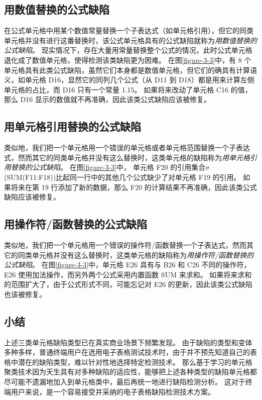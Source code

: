 \subsection{用数值替换的公式缺陷}
在公式单元格中用某个数值常量替换一个子表达式（如单元格引用），但它的同类单元格并没有进行这番替换时，该公式单元格具有的公式缺陷就称为\textit{用数值替换的公式缺陷}。
现实情况下，存在大量用常量替换整个公式的情况，此时公式单元格退化成了数值单元格，使得检测该类缺陷更为困难。
在图\ref{figure-3-3}中，有 8 个单元格具有此类公式缺陷，虽然它们本身都是数值单元格，但它们的确具有计算语义，如单元格 D16，显然它的同列几个公式（从 D11 到 D18）都是用来计算左侧单元格的占比，而 D16 只有一个常量 1.15。
如果将来改动了单元格 C16 的值，那么 D16 显示的数值就不再准确，因此该类公式缺陷应该被修复。

\subsection{用单元格引用替换的公式缺陷}
类似地，我们把一个单元格用一个错误的单元格或者单元格范围替换一个子表达式，然而其它的同类单元格并没有这么替换时，这类单元格的缺陷称为\textit{用单元格引用替换的公式缺陷}。
在图\ref{figure-3-3}中， 单元格 F20 的引用集合$\sigma$(SUM(F11:F18))比起同一行中的其他几个公式缺少了对单元格 F19 的引用。
如果将来在第 19 行添加了新的数据，那么 F20 的计算结果不再准确，因此该类公式缺陷应该被修复。

\subsection{用操作符/函数替换的公式缺陷}
类似地，我们把一个单元格用一个错误的操作符/函数替换一个子表达式，然而其它的同类单元格并没有这么替换时，这类单元格的缺陷称为\textit{用操作符/函数替换的公式缺陷}。
在图\ref{figure-3-3}中，单元格 E26 具有与 B26 和 C26 不同的操作符，E26 使用加法操作，而另外两个公式采用内置函数 SUM 来求和。
如果将来求和的范围扩大了，由于公式形式不同，可能忘记对 E26 的更新，因此该类公式缺陷也该被修复。

\subsection{小结}
上述三类单元格缺陷类型已在真实商业场景下频繁发现\cite{panko2006facing,powell2008critical}。
由于缺陷的类型和变体多种多样，普通终端用户在选用电子表格测试技术时，由于并不预先知道自己的表格中潜在的缺陷类型，难以针对性地选择特定检测技术。
那么基于学习的单元格聚类技术因为天生具有对多种缺陷的适应性，能够把上述各种类型的缺陷单元格都尽可能不遗漏地加入到单元格类中，最后再统一地进行缺陷检测分析。
这对于终端用户来说，是一个容易接受并采纳的电子表格缺陷检测技术方案。